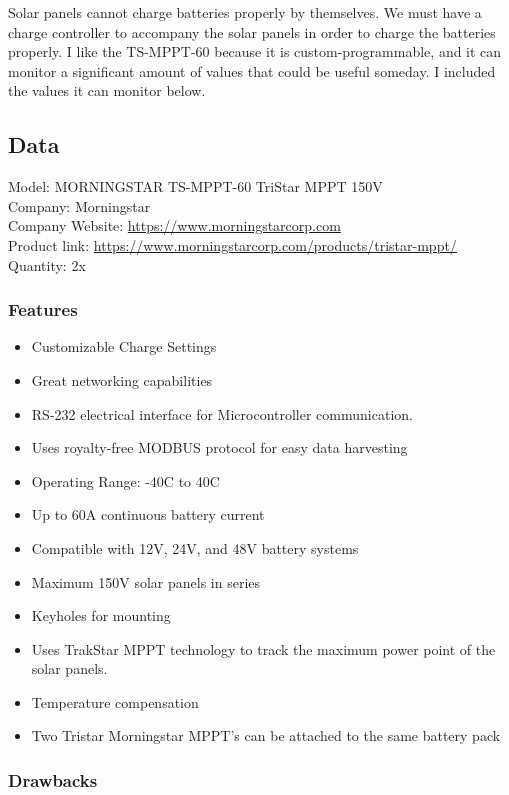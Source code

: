Solar panels cannot charge batteries properly by themselves. We must have a charge controller to accompany the solar panels in order to charge the batteries properly. I like the TS-MPPT-60 because it is custom-programmable, and it can monitor a significant amount of values that could be useful someday. I included the values it can monitor below.

\subsection{Data}
Model: MORNINGSTAR TS-MPPT-60 TriStar MPPT 150V\\
Company: Morningstar\\
Company Website: \href{https://www.morningstarcorp.com}{https://www.morningstarcorp.com}\\
Product link: \href{https://www.morningstarcorp.com/products/tristar-mppt/}{https://www.morningstarcorp.com/products/tristar-mppt/}\\
Quantity: 2x\\
\subsubsection{Features}
\begin{itemize}
	\item Customizable Charge Settings
	\item Great networking capabilities
	\item RS-232 electrical interface for Microcontroller communication.
	\item Uses royalty-free MODBUS protocol for easy data harvesting
	\item Operating Range: -40\degree C to 40\degree C
	\item Up to 60A continuous battery current
	\item Compatible with 12V, 24V, and 48V battery systems
	\item Maximum 150V solar panels in series
	\item Keyholes for mounting
	\item Uses TrakStar MPPT technology to track the maximum power point of the solar panels.
	\item Temperature compensation
	\item Two Tristar Morningstar MPPT’s can be attached to the same battery pack
\end{itemize}

\subsubsection{Drawbacks}

